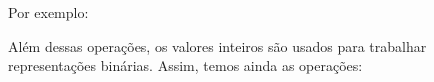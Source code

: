 \documentclass[
]{article}
\newenvironment{Shaded}{}{}
\newcommand{\CommentTok}[1]{\textcolor[rgb]{0.38,0.63,0.69}{\textit{#1}}}
\newcommand{\DataTypeTok}[1]{\textcolor[rgb]{0.56,0.13,0.00}{#1}}
\newcommand{\DecValTok}[1]{\textcolor[rgb]{0.25,0.63,0.44}{#1}}
\newcommand{\NormalTok}[1]{#1}
\newcommand{\SpecialCharTok}[1]{\textcolor[rgb]{0.25,0.44,0.63}{#1}}
\newcommand{\StringTok}[1]{\textcolor[rgb]{0.25,0.44,0.63}{#1}}
\begin{document}
Por exemplo:

\begin{Shaded}
\end{Shaded}

Além dessas operações, os valores inteiros são usados para trabalhar
representações binárias. Assim, temos ainda as operações:
\end{document}
